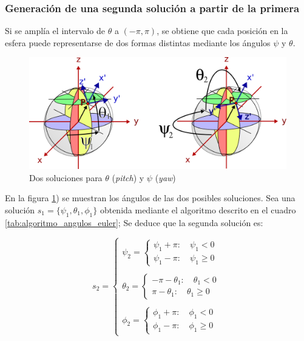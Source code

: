 \documentclass[12pt, a4paper]{report}
\begin{document}
\subsubsection{Generación de una segunda solución a partir de la primera}

Si se amplía el intervalo de $\theta$ a $(-\pi, \pi)$, se obtiene que cada posición en la esfera puede representarse de dos formas distintas mediante los ángulos $\psi$ y $\theta$. \\

\begin{figure}[h]
	\centering
		\includegraphics[scale=0.85]{../img/ea_solutions.png} 
	\caption{Dos soluciones para $\theta$ (\textit{pitch}) y $\psi$ (\textit{yaw})} 
	\label{fig: dos_soluciones_esfera}
\end{figure}

En la figura \ref{fig: dos_soluciones_esfera}) se muestran los ángulos de las dos posibles soluciones. Sea una solución $s_1 = \{ \psi_1, \theta_1, \phi_1 \}$ obtenida mediante el algoritmo descrito en el cuadro \ref{tab:algoritmo_angulos_euler}; Se deduce que la segunda solución es:

$$ s_2 = \begin{cases}

\psi_2 = \begin{cases}
	\psi_1 + \pi : \quad \psi_1 < 0 \\
	\psi_1 - \pi : \quad \psi_1 \geq 0 
\end{cases}\\
\\
\theta_2 = \begin{cases}
	-\pi - \theta_1 : \quad \theta_1 < 0 \\
	\pi - \theta_1 : \quad \theta_1 \geq 0 
\end{cases}\\
\\
\phi_2 = \begin{cases}
	\phi_1 + \pi : \quad \phi_1 < 0 \\
	\phi_1 - \pi : \quad \phi_1 \geq 0 
\end{cases}
\end{cases}
$$
\end{document}
